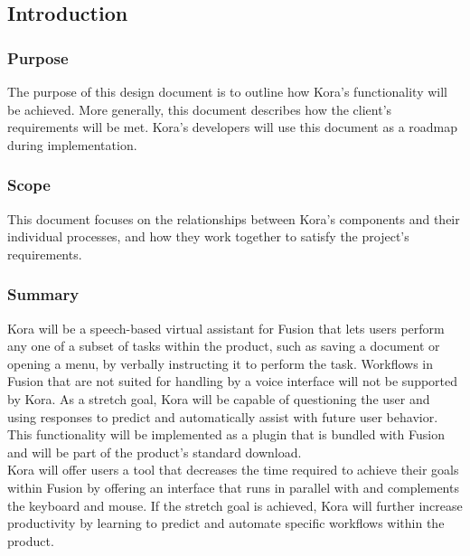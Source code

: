 \documentclass[onecolumn, draftclsnofoot,10pt, compsoc]{IEEEtran}
\newcommand{\newpara}{\\[0.1in]}
\def \botname{Kora\xspace}
\begin{document}
	\subsection{Introduction}
	\subsubsection{Purpose}
	The purpose of this design document is to outline how \botname's functionality will be achieved.
	More generally, this document describes how the client's requirements will be met.
	\botname's developers will use this document as a roadmap during implementation.

	\subsubsection{Scope}
	This document focuses on the relationships between \botname's components and their individual processes, and how they work together to satisfy the project's requirements.


	\subsubsection{Summary}
	\botname will be a speech-based virtual assistant for Fusion that lets users perform any one of a subset of tasks within the product, such as saving a document or opening a menu, by verbally instructing it to perform the task.
	Workflows in Fusion that are not suited for handling by a voice interface will not be supported by \botname.
	As a stretch goal, \botname will be capable of questioning the user and using responses to predict and automatically assist with future user behavior.
	This functionality will be implemented as a plugin that is bundled with Fusion and will be part of the product's standard download.
	\newpara
	\botname will offer users a tool that decreases the time required to achieve their goals within Fusion by offering an interface that runs in parallel with and complements the keyboard and mouse.
	If the stretch goal is achieved, \botname will further increase productivity by learning to predict and automate specific workflows within the product.
\end{document}
